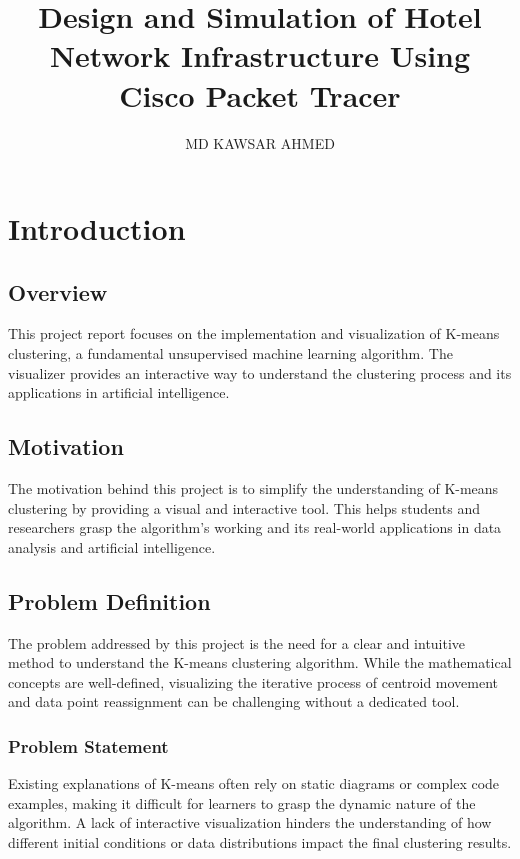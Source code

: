 \documentclass[12pt]{report}
\title{Design and Simulation of  Hotel Network Infrastructure Using Cisco Packet Tracer
}
\author{\textup{MD KAWSAR AHMED}}
\begin{document}
    
    \tableofcontents

\chapter{Introduction}

\section{Overview}
This project report focuses on the implementation and visualization of K-means clustering, a fundamental unsupervised machine learning algorithm. The visualizer provides an interactive way to understand the clustering process and its applications in artificial intelligence.

\section{Motivation}
The motivation behind this project is to simplify the understanding of K-means clustering by providing a visual and interactive tool. This helps students and researchers grasp the algorithm's working and its real-world applications in data analysis and artificial intelligence.

\section{Problem Definition}
The problem addressed by this project is the need for a clear and intuitive method to understand the K-means clustering algorithm. While the mathematical concepts are well-defined, visualizing the iterative process of centroid movement and data point reassignment can be challenging without a dedicated tool.

\subsection{Problem Statement}
Existing explanations of K-means often rely on static diagrams or complex code examples, making it difficult for learners to grasp the dynamic nature of the algorithm. A lack of interactive visualization hinders the understanding of how different initial conditions or data distributions impact the final clustering results.
\end{document}
